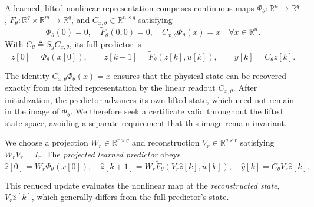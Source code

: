 \documentclass{l4dc2027}
\newcommand{\R}{\mathbb R}
\newcommand{\eqdef}{\triangleq}
\begin{document}
\begin{definition}\label{def:representation}
A learned, lifted nonlinear representation comprises continuous maps \mbox{$\Phi_\theta:\R^n\to\R^q$}, \mbox{$\widetilde F_\theta:\R^q\times\R^m\to\R^q$}, and \mbox{$C_{x,\theta}\in\R^{n\times q}$} satisfying
\[
 \Phi_\theta(0)=0,\quad \widetilde F_\theta(0,0)=0,\quad
 C_{x,\theta}\Phi_\theta(x)=x\quad\forall x\in\R^n.
\]
With \mbox{$C_\theta\eqdef S_yC_{x,\theta}$}, its full predictor is
\begin{equation}\label{eq:full}
 z[0]=\Phi_\theta(x[0]),\qquad
 z[k+1]=\widetilde F_\theta(z[k],u[k]),\qquad y[k]=C_\theta z[k].
\end{equation}
\end{definition}
The identity \mbox{$C_{x,\theta}\Phi_\theta(x)=x$} ensures that the physical state can be recovered exactly from its lifted representation by the linear readout \mbox{$C_{x,\theta}$}.
After initialization, the predictor advances its own lifted state, which need not remain in the image of \mbox{$\Phi_\theta$}.
We therefore seek a certificate valid throughout the lifted state space, avoiding a separate requirement that this image remain invariant.

\begin{definition}\label{def:reduced}
We choose a projection \mbox{$W_r\in\R^{r\times q}$} and reconstruction \mbox{$V_r\in\R^{q\times r}$} satisfying \mbox{$W_rV_r=I_r$}.
The \emph{projected learned predictor} obeys
\begin{equation}\label{eq:reduced}
 \widehat z[0]=W_r\Phi_\theta(x[0]),\quad
 \widehat z[k+1]=W_r\widetilde F_\theta(V_r\widehat z[k],u[k]),\quad
 \widehat y[k]=C_\theta V_r\widehat z[k].
\end{equation}
\end{definition}
This reduced update evaluates the nonlinear map at the \emph{reconstructed state}, \mbox{$V_r\widehat z[k]$}, which generally differs from the full predictor's state.
\end{document}
